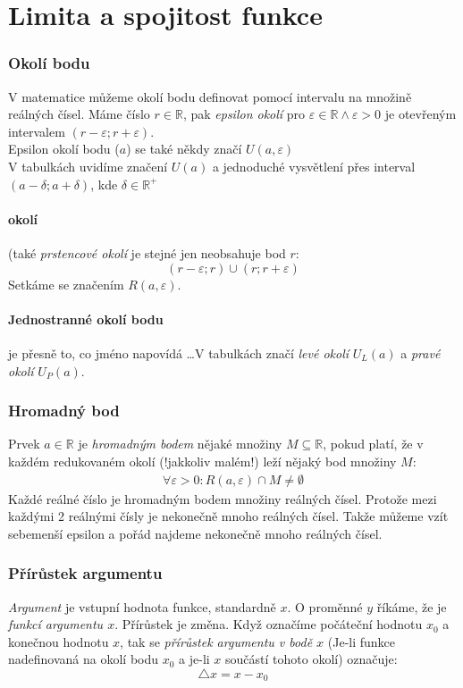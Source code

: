 \documentclass[12pt]{article}
\newcommand{\nR}{\mathbb{R}} %
\begin{document}
\section{Limita a spojitost funkce}
\subsubsection{Okolí bodu}
V matematice můžeme okolí bodu definovat pomocí intervalu na množině reálných čísel. Máme číslo $r\in \nR$, pak \emph{epsilon okolí} pro $\varepsilon \in \nR \land \varepsilon > 0$ je otevřeným intervalem $(r- \varepsilon; r + \varepsilon)$.\\
Epsilon okolí bodu ($a$) se také někdy značí $U(a, \varepsilon)$\\
V tabulkách uvidíme značení $U(a)$ a jednoduché vysvětlení přes interval $(a-\delta ;a +\delta )$, kde $\delta \in \nR^{+}$ 
\paragraph{okolí} (také \emph{prstencové okolí} je stejné jen neobsahuje bod $r$:
\begin{equation}
 (r-\varepsilon; r) \cup (r; r + \varepsilon)
\end{equation}
Setkáme se značením $R(a, \varepsilon )$.
\paragraph{Jednostranné okolí bodu} je přesně to, co jméno napovídá \dots V tabulkách značí \emph{levé okolí} $U_L(a)$ a \emph{pravé okolí} $U_P(a)$.
\subsubsection{Hromadný bod}
\label{sec:hromadny_bod}
Prvek $a \in \nR$ je \emph{hromadným bodem} nějaké množiny $M \subseteq \nR$, pokud platí, že v každém redukovaném okolí (!jakkoliv malém!) leží nějaký bod množiny $M$:
\begin{align}
\forall \varepsilon > 0: R(a, \varepsilon) \cap M \neq \emptyset
\end{align}
Každé reálné číslo je hromadným bodem množiny reálných čísel. Protože mezi každými 2 reálnými čísly je nekonečně mnoho reálných čísel. Takže můžeme vzít sebemenší epsilon a pořád najdeme nekonečně mnoho reálných čísel.
\subsubsection{Přírůstek argumentu}
\emph{Argument} je vstupní hodnota funkce, standardně $x$. O proměnné $y$ říkáme, že je \emph{funkcí argumentu $x$}. Přírůstek je změna. Když označíme počáteční hodnotu $x_0$ a konečnou hodnotu $x$, tak se \emph{přírůstek argumentu v bodě $x$} (Je-li funkce nadefinovaná na okolí bodu $x_0$ a je-li $x$ součástí tohoto okolí) označuje:
\begin{equation}
\triangle x = x - x_0
\end{equation}
\end{document}
